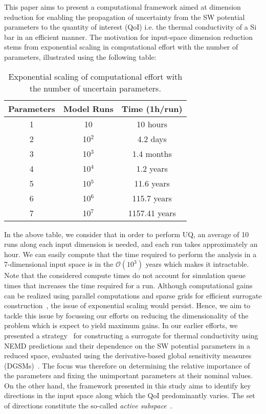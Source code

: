 This paper aims to present a computational framework aimed at dimension reduction
for enabling the propagation of uncertainty from the SW potential parameters to the
quantity of interest (QoI) i.e. the thermal conductivity of a Si bar in an efficient manner. The
motivation for input-space dimension reduction stems from exponential scaling in
computational effort with the number of parameters, illustrated using the following
table:
%
\newcommand{\ra}[1]{\renewcommand{\arraystretch}{#1}}
\begin{table}[htbp]
\centering
\ra{1.3}
\begin{tabular}{@{}ccc@{}}\toprule
Parameters & Model Runs & Time (1h/run)\\
\bottomrule
1 & 10 & 10 hours \\
2 & 10$^2$ & 4.2 days \\
3 & 10$^3$ & 1.4 months \\
4 & 10$^4$ & 1.2 years \\
5 & 10$^5$ & 11.6 years \\
6 & 10$^6$ & 115.7 years \\
7 & 10$^7$ & 1157.41 years \\
\bottomrule
\end{tabular}
\caption{Exponential scaling of computational effort with the number of uncertain parameters.}
\end{table}
%
In the above table, we consider that in order to perform UQ, an average of 10 runs along each input dimension
is needed, and each run takes approximately an hour. We can easily compute that the time required to 
perform the analysis in a 7-dimensional input space is in the $\mathcal{O}(10^3)$ years which makes it
intractable. Note that the considered compute times do not account for simulation queue times that 
increases the time required for a run. 
Although computational gains can be realized using parallel computations and sparse grids
for efficient surrogate construction~\cite{Ma:2009,Constantine:2012,Petvipusit:2014,Vohra:2014}, 
the issue of exponential scaling would persist.  
Hence, we aim to tackle this issue by focussing our efforts on reducing the dimensionality of the problem
which is expect to yield maximum gains. In our earlier efforts, we presented a strategy~\cite{Vohra:2018b}
for constructing a surrogate for thermal conductivity using NEMD predictions and their dependence
on the SW potential parameters in a reduced space, evaluated using the derivative-based global sensitivity measures
(DGSMs)~\cite{Vohra:2018a}. The focus was therefore on determining the relative importance of the
parameters and fixing the unimportant parameters at their nominal values. On the other hand, the
framework presented in this study aims to identify key directions in the input space along which the
QoI predominantly varies. The set of directions constitute the so-called 
\textit{active subspace}~\cite{Constantine:2015}.  

